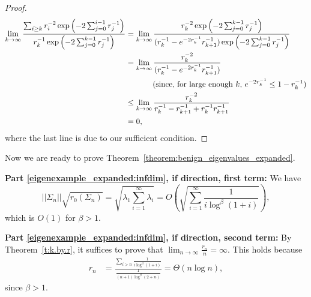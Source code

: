 \documentclass[11pt,notitlepage]{article}
\begin{document}
\begin{proof}
\begin{align*}
                \lim_{k \rightarrow \infty}
                \frac{\sum_{i \geq k}
                r_{i}^{-2}\exp\left(-2\sum_{j=0}^{i-1}r_{j}^{-1}\right)}{r_k^{-1}\exp\left(-2\sum_{j=0}^{k-1}r_{j}^{-1}\right)}
               & =  \lim_{k \rightarrow \infty}
		\frac{r_{k}^{-2}\exp\left(-2\sum_{j=0}^{k-1}r_{j}^{-1}\right)}{(r_k^{-1} - e^{-2r_k^{-1}}r_{k+1}^{-1})\exp\left(-2\sum_{j=0}^{k-1}r_{j}^{-1}\right) } \\
                 & =  \lim_{k \rightarrow \infty} 
           \frac{r_{k}^{-2}}{(r_k^{-1} - e^{-2r_k^{-1}}r_{k+1}^{-1})} \\
 & \hspace{0.2in}
   \quad 
   \quad 
              \text{(since, for large enough $k$,
                  $e^{-2r_k^{-1}} \leq 1-r_k^{-1}$)} \\
		& \leq 
          \lim_{k \rightarrow \infty} \frac{r_{k}^{-2}}{r_k^{-1} - r_{k+1}^{-1} + r_k^{-1}r_{k+1}^{-1}}\\
		& = 0,
		\end{align*}
		where the last line is due to our sufficient condition.
	\end{proof}

\medskip
Now we are ready to prove
Theorem~\ref{theorem:benign_eigenvalues_expanded}.

\noindent
{\bf Part \ref{eigenexample_expanded:infdim}, if direction, first term:}  We have
\[
|| \Sigma_n || \sqrt{r_0(\Sigma_n)} 
  = \sqrt{ \lambda_1 \sum_{i=1}^{\infty} \lambda_i}
      = O\left( \sqrt{\sum_{i=1}^{\infty} \frac{1}{i \log^{\beta} (1 +
      i)}} \right),
\]
which is $O(1)$ for $\beta > 1$.

\noindent
{\bf Part \ref{eigenexample_expanded:infdim}, if direction, second term:}  
By Theorem~\ref{t:k.by.r}, it suffices to prove
that $\lim_{n\rightarrow \infty} \frac{r_n}{n} = \infty$.  This holds because
\begin{align*}
r_n 
 & = \frac{ \sum_{i > n} \frac{1}{i \log^{\beta} (1 + i)}}{\frac{1}{(n+1) \log^{\beta} (2 + n)}} 
  = \Theta(n \log n),
\end{align*}
since $\beta > 1$.
\end{document}
